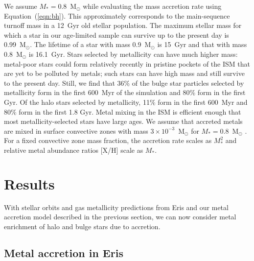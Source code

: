 \documentclass[a4paper,fleqn,usenatbib]{mnras}
\begin{document}
We assume $M_*=0.8$~M$_\odot$ while evaluating the mass accretion rate
using Equation~(\ref{eqn:bh}).  This approximately corresponds to the
main-sequence turnoff mass in a 12~Gyr old stellar population.  The
maximum stellar mass for which a star in our age-limited sample can
survive up to the present day is 0.99~M$_\odot$.  The lifetime of a
star with mass 0.9~M$_\odot$ is 15~Gyr and that with mass
0.8~M$_\odot$ is 16.1~Gyr.  Stars selected by metallicity can have
much higher mass: metal-poor stars could form relatively recently in
pristine pockets of the ISM that are yet to be polluted by metals;
such stars can have high mass and still survive to the present day.
Still, we find that 36\% of the bulge star particles selected by
metallicity form in the first 600~Myr of the simulation and 80\% form
in the first Gyr.  Of the halo stars selected by metallicity, 11\%
form in the first 600~Myr and 80\% form in the first 1.8 Gyr.  Metal
mixing in the ISM is efficient enough that most metallicity-selected
stars have large ages.  We assume that accreted metals are mixed in
surface convective zones with mass $3\times 10^{-3}$~M$_\odot$ for
$M_*=0.8$~M$_\odot$ \citep{1981A&A....97..280Y, 1995ApJ...444..175F}.
For a fixed convective zone mass fraction, the accretion rate scales
as $M_*^2$ and relative metal abundance ratios [X/H] scale as $M_*$.

\section{Results}
\label{sec:results}

With stellar orbits and gas metallicity predictions from Eris and our
metal accretion model described in the previous section, we can now
consider metal enrichment of halo and bulge stars due to accretion. 

\subsection{Metal accretion in Eris}
\end{document}
